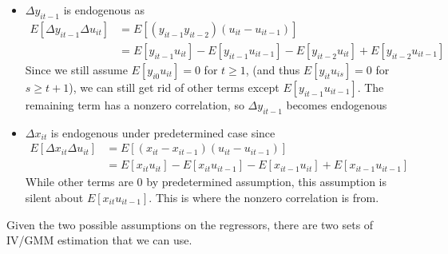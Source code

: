 \documentclass[12pt]{article}
\theoremstyle{definition}
\theoremstyle{property}
\theoremstyle{assumption}
\theoremstyle{example}
\theoremstyle{comment}
\begin{document}
\begin{itemize}
\item $\Delta y_{it-1}$ is endogenous as 
\begin{align*}
E[\Delta y_{it-1}\Delta u_{it}] &= E[(y_{it-1}y_{it-2})(u_{it}-u_{it-1})]\\
&=E[y_{it-1}u_{it}]-E[y_{it-1}u_{it-1}]-E[y_{it-2}u_{it}]+E[y_{it-2}u_{it-1}]
\end{align*}
Since we still assume $E[y_{i0}u_{it}]=0$ for $t\geq1$, (and thus $E[y_{it}u_{is}]=0$ for $s\geq t+1$), we can still get rid of other terms except $E[y_{it-1}u_{it-1}]$. The remaining term has a nonzero correlation, so $\Delta y_{it-1}$ becomes endogenous
\item  $\Delta x_{it}$ is endogenous under predetermined case since
\begin{align*}
E[\Delta x_{it}\Delta u_{it}]&=E[(x_{it}-x_{it-1})(u_{it}-u_{it-1})]\\
&=E[x_{it}u_{it}]-E[x_{it}u_{it-1}]-E[x_{it-1}u_{it}]+E[x_{it-1}u_{it-1}]
\end{align*}
While other terms are 0 by predetermined assumption, this assumption is silent about $E[x_{it}u_{it-1}]$. This is where the nonzero correlation is from. 
\end{itemize}\par
Given the two possible assumptions on the regressors, there are two sets of IV/GMM estimation that we can use.\par
\end{document}

